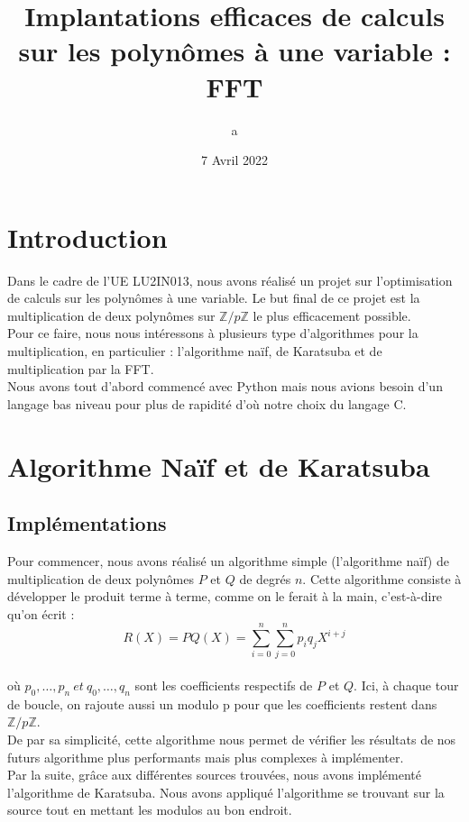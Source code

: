 \documentclass[12pt, a4paper]{article}
\title{Implantations efficaces de calculs sur les polynômes à une variable : FFT}
\author{a}
\date{7 Avril 2022}
\begin{document}
\maketitle
\tableofcontents
\newpage

\section*{Introduction}
Dans le cadre de l'UE LU2IN013, nous avons réalisé un projet sur l'optimisation de calculs sur les polynômes à une variable. Le but final de ce projet est la multiplication de deux polynômes sur $\mathbb{Z}/p\mathbb{Z}$ le plus efficacement possible.\\
Pour ce faire, nous nous intéressons à plusieurs type d'algorithmes pour la multiplication, en particulier : l'algorithme naïf, de Karatsuba et de multiplication par la FFT.\\
Nous avons tout d'abord commencé avec Python mais nous avions besoin d'un langage bas niveau pour plus de rapidité d'où notre choix du langage C.

\section{Algorithme Naïf et de Karatsuba}
\subsection{Implémentations}

Pour commencer, nous avons réalisé un algorithme simple (l'algorithme naïf) de multiplication de deux polynômes $P$ et $Q$ de degrés $n$. Cette algorithme consiste à développer le produit terme à terme, comme on le ferait à la main, c'est-à-dire qu'on écrit : \\
\[R(X) = PQ(X) =
\displaystyle\sum_{i=0}^{n}\sum_{j=0}^{n} p_i q_j X^{i+j}\] \\
où $p_0,\dots,p_n\ et\ q_0,\dots,q_n$ sont les coefficients respectifs de $P$ et $Q$. Ici, à chaque tour de boucle, on rajoute aussi un modulo p pour que les coefficients restent dans $\mathbb{Z}/p\mathbb{Z}$.\\
De par sa simplicité, cette algorithme nous permet de vérifier les résultats de nos futurs algorithme plus performants mais plus complexes à implémenter.\\
Par la suite, grâce aux différentes sources 
trouvées, nous avons implémenté l'algorithme de Karatsuba. Nous avons appliqué l'algorithme se trouvant sur la source \cite{Karatsuba} tout en mettant les modulos au bon endroit.
\end{document}
